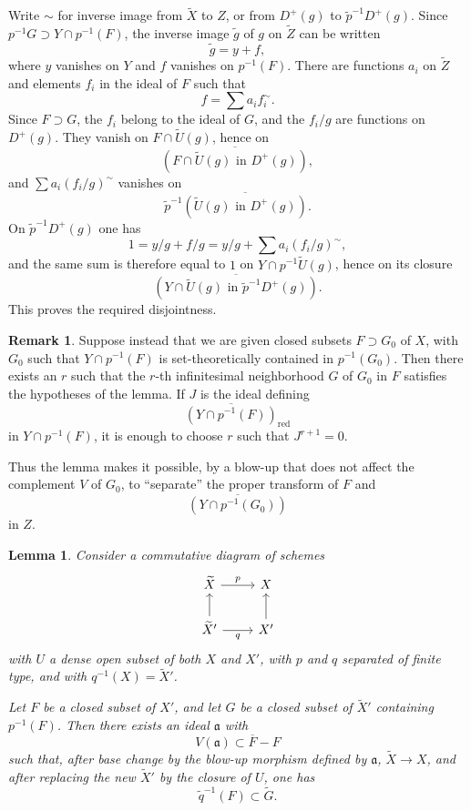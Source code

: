 \documentclass[11pt,a4paper]{article}
\theoremstyle{plain}
\newtheorem{lemma}[theorem]{Lemma}
\theoremstyle{definition}
\newtheorem{remark}[theorem]{Remark}
\begin{document}
Write $\sim$ for inverse image from $\widetilde X$ to $Z$, or from $D^+(g)$ to $\tilde p^{-1}D^+(g)$. Since $p^{-1}G\supset Y\cap p^{-1}(F)$, the inverse image $\tilde g$ of $g$ on $\widetilde Z$ can be written
\[
\tilde g=y+f,
\]
where $y$ vanishes on $Y$ and $f$ vanishes on $p^{-1}(F)$. There are functions $a_i$ on $\widetilde Z$ and elements $f_i$ in the ideal of $F$ such that
\[
f=\sum a_i f_i^{\sim}.
\]
Since $F\supset G$, the $f_i$ belong to the ideal of $G$, and the $f_i/g$ are functions on $D^+(g)$. They vanish on $F\cap\widetilde U(g)$, hence on
\[
\overline{(F\cap\widetilde U(g)\text{ in }D^+(g))},
\]
and $\sum a_i(f_i/g)^{\sim}$ vanishes on
\[
\tilde p^{-1}\overline{(\widetilde U(g)\text{ in }D^+(g))}.
\]
On $\tilde p^{-1}D^+(g)$ one has
\[
1=y/g+f/g=y/g+\sum a_i(f_i/g)^{\sim},
\]
and the same sum is therefore equal to $1$ on $Y\cap p^{-1}\widetilde U(g)$, hence on its closure
\[
\overline{(Y\cap\widetilde U(g)\text{ in }\tilde p^{-1}D^+(g))}.
\]
This proves the required disjointness.

\begin{remark}
Suppose instead that we are given closed subsets $F\supset G_0$ of $X$, with $G_0$ such that $Y\cap p^{-1}(F)$ is set-theoretically contained in $p^{-1}(G_0)$. Then there exists an $r$ such that the $r$-th infinitesimal neighborhood $G$ of $G_0$ in $F$ satisfies the hypotheses of the lemma. If $J$ is the ideal defining
\[
\overline{(Y\cap p^{-1}(F))}_{\mathrm{red}}
\]
in $Y\cap p^{-1}(F)$, it is enough to choose $r$ such that $J^{r+1}=0$.

Thus the lemma makes it possible, by a blow-up that does not affect the complement $V$ of $G_0$, to ``separate'' the proper transform of $F$ and
\[
\overline{(Y\cap p^{-1}(G_0))}
\]
in $Z$.
\end{remark}

\begin{lemma}
Consider a commutative diagram of schemes
\[
\begin{tikzcd}
\widetilde X \arrow[r,"p"] & X \\
\widetilde X' \arrow[u] \arrow[r,"q"'] & X' \arrow[u]
\end{tikzcd}
\]
with $U$ a dense open subset of both $X$ and $X'$, with $p$ and $q$ separated of finite type, and with $q^{-1}(X)=\widetilde X'$.

Let $F$ be a closed subset of $X'$, and let $G$ be a closed subset of $\widetilde X'$ containing $p^{-1}(F)$. Then there exists an ideal $\mathfrak a$ with
\[
V(\mathfrak a)\subset \overline F-F
\]
such that, after base change by the blow-up morphism defined by $\mathfrak a$, $\widetilde X\to X$, and after replacing the new $\widetilde X'$ by the closure of $U$, one has
\[
\widetilde q^{-1}(F)\subset \widetilde G.
\]
\end{lemma}
\end{document}
